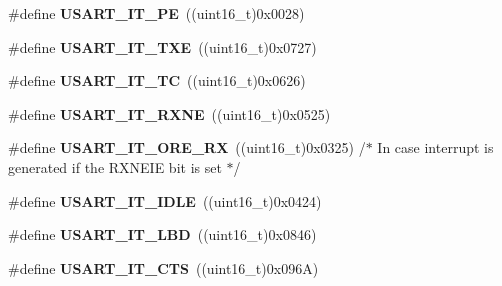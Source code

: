 \begin{DoxyCompactItemize}
\item 
\#define {\bfseries U\+S\+A\+R\+T\+\_\+\+I\+T\+\_\+\+PE}~((uint16\+\_\+t)0x0028)\hypertarget{group___u_s_a_r_t___interrupt__definition_gae607c28a462c224c575b7541dc4f7067}{}\label{group___u_s_a_r_t___interrupt__definition_gae607c28a462c224c575b7541dc4f7067}

\item 
\#define {\bfseries U\+S\+A\+R\+T\+\_\+\+I\+T\+\_\+\+T\+XE}~((uint16\+\_\+t)0x0727)\hypertarget{group___u_s_a_r_t___interrupt__definition_gab18d0fe889204a4c34f6d5817fb5147d}{}\label{group___u_s_a_r_t___interrupt__definition_gab18d0fe889204a4c34f6d5817fb5147d}

\item 
\#define {\bfseries U\+S\+A\+R\+T\+\_\+\+I\+T\+\_\+\+TC}~((uint16\+\_\+t)0x0626)\hypertarget{group___u_s_a_r_t___interrupt__definition_ga748e86162cc110513330079982821c39}{}\label{group___u_s_a_r_t___interrupt__definition_ga748e86162cc110513330079982821c39}

\item 
\#define {\bfseries U\+S\+A\+R\+T\+\_\+\+I\+T\+\_\+\+R\+X\+NE}~((uint16\+\_\+t)0x0525)\hypertarget{group___u_s_a_r_t___interrupt__definition_gacdd49b93072655a21a63a35e6431f8ae}{}\label{group___u_s_a_r_t___interrupt__definition_gacdd49b93072655a21a63a35e6431f8ae}

\item 
\#define {\bfseries U\+S\+A\+R\+T\+\_\+\+I\+T\+\_\+\+O\+R\+E\+\_\+\+RX}~((uint16\+\_\+t)0x0325) /$\ast$ In case interrupt is generated if the R\+X\+N\+E\+I\+E bit is set $\ast$/\hypertarget{group___u_s_a_r_t___interrupt__definition_gaad8fd44c80b30285dc3088a0b3aa5bd9}{}\label{group___u_s_a_r_t___interrupt__definition_gaad8fd44c80b30285dc3088a0b3aa5bd9}

\item 
\#define {\bfseries U\+S\+A\+R\+T\+\_\+\+I\+T\+\_\+\+I\+D\+LE}~((uint16\+\_\+t)0x0424)\hypertarget{group___u_s_a_r_t___interrupt__definition_ga5d85aab24b7b2dfddb61ba2a49fa6185}{}\label{group___u_s_a_r_t___interrupt__definition_ga5d85aab24b7b2dfddb61ba2a49fa6185}

\item 
\#define {\bfseries U\+S\+A\+R\+T\+\_\+\+I\+T\+\_\+\+L\+BD}~((uint16\+\_\+t)0x0846)\hypertarget{group___u_s_a_r_t___interrupt__definition_ga063628e16cdda199b07d380421afc4a5}{}\label{group___u_s_a_r_t___interrupt__definition_ga063628e16cdda199b07d380421afc4a5}

\item 
\#define {\bfseries U\+S\+A\+R\+T\+\_\+\+I\+T\+\_\+\+C\+TS}~((uint16\+\_\+t)0x096\+A)\hypertarget{group___u_s_a_r_t___interrupt__definition_gab49efbefaca2921e8cbe8f5146e99dbd}{}\label{group___u_s_a_r_t___interrupt__definition_gab49efbefaca2921e8cbe8f5146e99dbd}


\end{DoxyCompactItemize}
